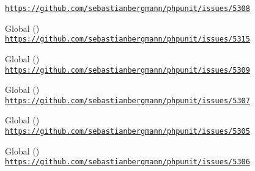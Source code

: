\begin{DoxyRefList}
\label{deprecated__deprecated000312}%
%
\href{https://github.com/sebastianbergmann/phpunit/issues/5308}{\texttt{https\+://github.\+com/sebastianbergmann/phpunit/issues/5308}}  
\item[Global \doxylink{class_p_h_p_unit_1_1_framework_1_1_mock_object_1_1_mock_builder_a8e48ca0c7e6a7a3a55018e8b1767050e}{Mock\+Builder\+::enable\+Argument\+Cloning} ()]\hfill \\
\label{deprecated__deprecated000307}%
%
\href{https://github.com/sebastianbergmann/phpunit/issues/5315}{\texttt{https\+://github.\+com/sebastianbergmann/phpunit/issues/5315}}  
\item[Global \doxylink{class_p_h_p_unit_1_1_framework_1_1_mock_object_1_1_mock_builder_a0ba499758ad2a729532aabad1fbb0abe}{Mock\+Builder\+::enable\+Autoload} ()]\hfill \\
\label{deprecated__deprecated000305}%
%
\href{https://github.com/sebastianbergmann/phpunit/issues/5309}{\texttt{https\+://github.\+com/sebastianbergmann/phpunit/issues/5309}}  
\item[Global \doxylink{class_p_h_p_unit_1_1_framework_1_1_mock_object_1_1_mock_builder_a5896d495f4fe2aa455c74a08316675b2}{Mock\+Builder\+::enable\+Proxying\+To\+Original\+Methods} ()]\hfill \\
\label{deprecated__deprecated000308}%
%
\href{https://github.com/sebastianbergmann/phpunit/issues/5307}{\texttt{https\+://github.\+com/sebastianbergmann/phpunit/issues/5307}} 
\item[Global \doxylink{class_p_h_p_unit_1_1_framework_1_1_mock_object_1_1_mock_builder_a372a03ed414fc6235c9a09a39eb17e89}{Mock\+Builder\+::get\+Mock\+For\+Abstract\+Class} ()]\hfill \\
\label{deprecated__deprecated000301}%
%
\href{https://github.com/sebastianbergmann/phpunit/issues/5305}{\texttt{https\+://github.\+com/sebastianbergmann/phpunit/issues/5305}}  
\item[Global \doxylink{class_p_h_p_unit_1_1_framework_1_1_mock_object_1_1_mock_builder_a54f678d907203b42b4c6b81672207d27}{Mock\+Builder\+::get\+Mock\+For\+Trait} ()]\hfill \\
\label{deprecated__deprecated000302}%
%
\href{https://github.com/sebastianbergmann/phpunit/issues/5306}{\texttt{https\+://github.\+com/sebastianbergmann/phpunit/issues/5306}}  

\end{DoxyRefList}
